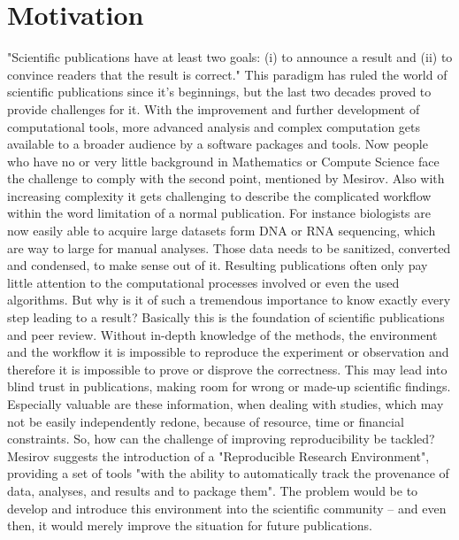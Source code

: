 \section{Motivation}
"Scientific publications have at least two goals: (i) to announce a result and (ii) to convince readers that the result is correct." \cite{Mesirov2010}
This paradigm has ruled the world of scientific publications since it's beginnings, but the last two decades proved to provide challenges for it. With the improvement and further development of computational tools, more advanced analysis and complex computation gets available to a broader audience by a software packages and tools. Now people who have no or very little background in Mathematics or Compute Science face the challenge to comply with the second point, mentioned by Mesirov. Also with increasing complexity it gets challenging to describe the complicated workflow within the word limitation of a normal publication.
For instance biologists are now easily able to acquire large datasets form DNA or RNA sequencing, which are way to large for manual analyses. Those data needs to be sanitized, converted and condensed, to make sense out of it. Resulting publications often only pay little attention to the computational processes involved or even the used algorithms.
But why is it of such a tremendous importance to know exactly every step leading to a result? Basically this is the foundation of scientific publications and peer review. Without in-depth knowledge of the methods, the environment and the workflow it is impossible to reproduce the experiment or observation and therefore it is impossible to prove or disprove the correctness. This may lead into blind trust in publications, making room for wrong or made-up scientific findings.
Especially valuable are these information, when dealing with studies, which may not be easily independently redone, because of resource, time or financial constraints. \cite{Peng2011}
So, how can the challenge of improving reproducibility be tackled? Mesirov \cite{Mesirov2010} suggests the introduction of a "Reproducible Research Environment", providing a set of tools "with the ability to automatically track the provenance of data, analyses, and results and to package them".
The problem would be to develop and introduce this environment into the scientific community -- and even then, it would merely improve the situation for future publications.

